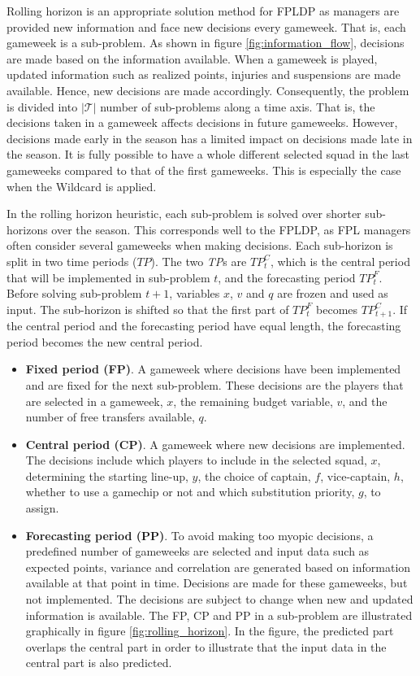Rolling horizon is an appropriate solution method for FPLDP as managers are provided new information and face new decisions every gameweek. That is, each gameweek is a sub-problem. As shown in figure \ref{fig:information_flow}, decisions are made based on the information available. When a gameweek is played, updated information such as realized points, injuries and suspensions are made available. Hence, new decisions are made accordingly. Consequently, the problem is divided into $\mathcal{|T|}$ number of sub-problems along a time axis. That is, the decisions taken in a gameweek affects decisions in future gameweeks. However, decisions made early in the season has a limited impact on decisions made late in the season. It is fully possible to have a whole different selected squad in the last gameweeks compared to that of the first gameweeks. This is especially the case when the Wildcard is applied.

\newpar

In the rolling horizon heuristic, each sub-problem is solved over shorter sub-horizons over the season. This corresponds well to the FPLDP, as FPL managers often consider several gameweeks when making decisions. Each sub-horizon is split in two time periods ($TP$). The two \textit{TP}s are $TP_t^{C}$, which is the central period that will be implemented in sub-problem $t$, and the forecasting period $TP_t^{F}$. Before solving sub-problem $t+1$, variables $x$, $v$ and $q$ are frozen and used as input. The sub-horizon is shifted so that the first part of $TP_t^{F}$ becomes $TP_{t+1}^{C}$. If the central period and the forecasting period have equal length, the forecasting period becomes the new central period. 

\begin{itemize}
    \item \textbf{Fixed period (FP)}. A gameweek where decisions have been implemented and are fixed for the next sub-problem. These decisions are the players that are selected in a gameweek, $x$, the remaining budget variable, $v$, and the number of free transfers available, $q$.
    \item \textbf{Central period (CP)}. A gameweek where new decisions are implemented. The decisions include which players to include in the selected squad, $x$, determining the starting line-up, $y$, the choice of captain, $f$,  vice-captain, $h$, whether to use a gamechip or not and which substitution priority, $g$, to assign.  
    \item \textbf{Forecasting period (PP)}. To avoid making too myopic decisions, a predefined number of gameweeks are selected and input data such as expected points, variance and correlation are generated based on information available at that point in time. Decisions are made for these gameweeks, but not implemented.  The decisions are subject to change when new and updated information is available. The FP, CP and PP in a sub-problem are illustrated graphically in figure \ref{fig:rolling_horizon}. In the figure, the predicted part overlaps the central part in order to illustrate that the input data in the central part is also predicted.
\end{itemize}


